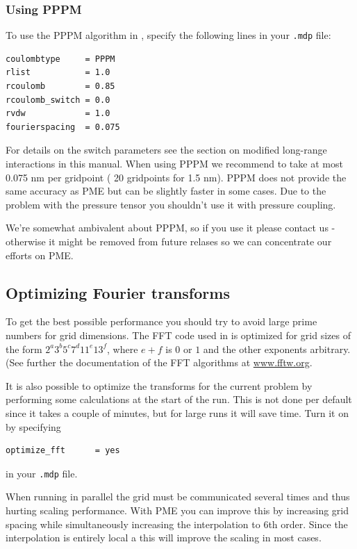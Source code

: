 \subsubsection{Using PPPM}
To use the PPPM algorithm in {\gromacs}, specify the
following lines in your {\tt .mdp} file:
\begin{verbatim}
coulombtype     = PPPM
rlist           = 1.0
rcoulomb        = 0.85
rcoulomb_switch = 0.0
rvdw            = 1.0
fourierspacing  = 0.075
\end{verbatim}
For details on the switch parameters see the section on modified
long-range interactions in this manual. When using PPPM we recommend
to take at most 0.075 nm per gridpoint ({\eg} 20 gridpoints for 1.5
nm).  PPPM does not provide the same accuracy as PME but can be
slightly faster in some cases. Due to the problem with the pressure
tensor you shouldn't use it with pressure coupling.

We're somewhat ambivalent about PPPM, so if you use it please contact
us - otherwise it might be removed from future relases so we can concentrate
our efforts on PME.


\subsection{Optimizing Fourier transforms}
To get the best possible performance you should try to avoid large
prime numbers for grid dimensions.
The FFT code used in {\gromacs} is
optimized for grid sizes of the form $2^a 3^b 5^c 7^d 11^e 13^f$,
where $e+f$ is $0$ or $1$ and the other exponents arbitrary. (See
further the documentation of the FFT algorithms at 
\href{http://www.fftw.org}{www.fftw.org}.

It is also possible to optimize the transforms for the current problem
by performing some calculations at the start of the run. This is not
done per default since it takes a couple of minutes, but for large
runs it will save time. Turn it on by specifying

\begin{verbatim}
optimize_fft      = yes
\end{verbatim}
in your {\tt .mdp} file.

When running in parallel the grid must be communicated several times
and thus hurting scaling performance. With PME you can improve this
by increasing grid spacing while simultaneously increasing the
interpolation to {\eg} 6th order. 
Since the interpolation is entirely local a this will
improve the scaling in most cases.


